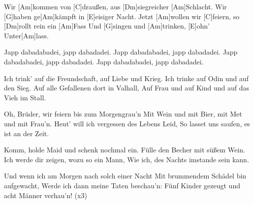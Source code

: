 

\begin{guitar}
	Wir [Am]kommen von [C]draußen, aus [Dm]siegreicher [Am]Schlacht.
	Wir [G]haben ge[Am]kämpft in [E]eisiger Nacht.
	Jetzt [Am]wollen wir [C]feiern, so [Dm]rollt rein ein [Am]Fass
	Und [G]singen und [Am]trinken, [E]ohn' Unter[Am]lass.
	
	Japp dabadabadei, japp dabadadei. Japp dabadabadei, japp dabadadei.
	Japp dabadabadei, japp dabadadei. Japp dabadabadei, japp dabadadei.
	
	Ich trink' auf die Freundschaft, auf Liebe und Krieg.
	Ich trinke auf Odin und auf den Sieg.
	Auf alle Gefallenen dort in Valhall,
	Auf Frau und auf Kind und auf das Vieh im Stall.
	
	 
	
	Oh, Brüder, wir feiern bis zum Morgengrau'n
	Mit Wein und mit Bier, mit Met und mit Frau'n.
	Heut' will ich vergessen des Lebens Leid,
	So lasset uns saufen, es ist an der Zeit.
	
	 
	
	Komm, holde Maid und schenk nochmal ein.
	Fülle den Becher mit süßem Wein.
	Ich werde dir zeigen, wozu so ein Mann,
	Wie ich, des Nachts imstande sein kann.
	
	 
	
	Und wenn ich am Morgen nach solch einer Nacht
	Mit brummendem Schädel bin aufgewacht,
	Werde ich dann meine Taten beschau'n:
	Fünf Kinder gezeugt und acht Männer verhau'n!\vspace{0.3em}
	  (x3)
	\end{guitar}
